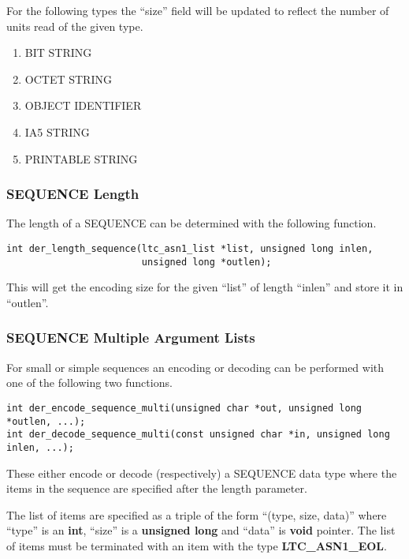 \documentclass[a4paper]{book}
\begin{document}
For the following types the ``size'' field will be updated to reflect the number of units read of the given type.
\begin{enumerate}
   \item BIT STRING
   \item OCTET STRING
   \item OBJECT IDENTIFIER
   \item IA5 STRING
   \item PRINTABLE STRING
\end{enumerate}

\subsubsection{SEQUENCE Length}

The length of a SEQUENCE can be determined with the following function.

\begin{verbatim}
int der_length_sequence(ltc_asn1_list *list, unsigned long inlen,
                        unsigned long *outlen);
\end{verbatim}

This will get the encoding size for the given ``list'' of length ``inlen'' and store it in ``outlen''.  

\subsubsection{SEQUENCE Multiple Argument Lists}

For small or simple sequences an encoding or decoding can be performed with one of the following two functions.


\begin{verbatim}
int der_encode_sequence_multi(unsigned char *out, unsigned long *outlen, ...);
int der_decode_sequence_multi(const unsigned char *in, unsigned long inlen, ...);
\end{verbatim}

These either encode or decode (respectively) a SEQUENCE data type where the items in the sequence are specified after the length parameter.

The list of items are specified as a triple of the form ``(type, size, data)''  where ``type'' is an \textbf{int}, ``size'' is a \textbf{unsigned long}
and ``data'' is \textbf{void} pointer.  The list of items must be terminated with an item with the type \textbf{LTC\_ASN1\_EOL}.
\end{document}
